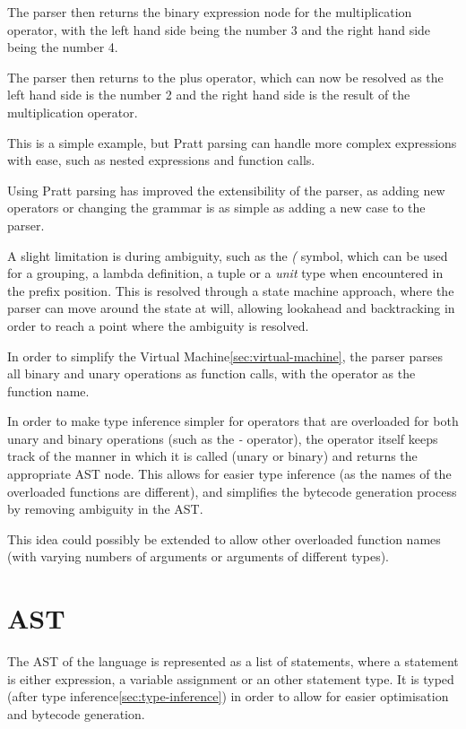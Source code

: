 The parser then returns the binary expression node for the multiplication operator, with the left hand side being
the number 3 and the right hand side being the number 4.

The parser then returns to the plus operator, which can now be resolved as the left hand side is the number 2 and the
right hand side is the result of the multiplication operator.

This is a simple example, but Pratt parsing can handle more complex expressions with ease, such as nested
expressions and function calls.

Using Pratt parsing has improved the extensibility of the parser, as adding new operators or changing the grammar
is as simple as adding a new case to the parser.

A slight limitation is during ambiguity, such as the \textit{(} symbol, which can be used for a grouping, a lambda 
definition, a tuple or a \textit{unit} type when encountered in the prefix position.
This is resolved through a state machine approach, where the parser can move around the state at will, allowing 
lookahead and backtracking in order to reach a point where the ambiguity is resolved.

In order to simplify the Virtual Machine\ref{sec:virtual-machine}, the parser parses all binary and unary operations 
as function calls, with the operator as the function name.

In order to make type inference simpler for operators that are overloaded for both unary and binary operations (such 
as the \textit{-} operator), the operator itself keeps track of the manner in which it is called (unary or binary) and
returns the appropriate AST node. 
This allows for easier type inference (as the names of the overloaded functions are different), 
and simplifies the bytecode generation process by removing ambiguity in the AST\@.

This idea could possibly be extended to allow other overloaded function names (with varying numbers of arguments or 
arguments of different types).

\section{AST}\label{sec:expression}

The AST of the language is represented as a list of statements, where a statement is either expression, a
variable assignment or an other statement type.
It is typed (after type inference\ref{sec:type-inference}) in order to allow for easier optimisation and
bytecode generation.

